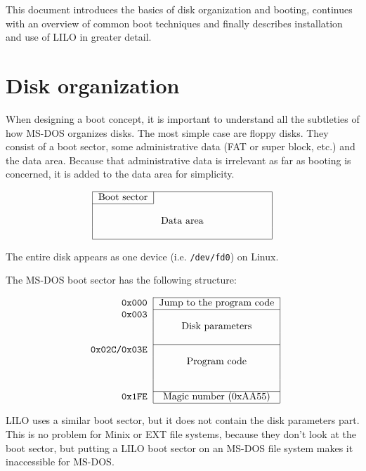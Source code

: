 This document introduces the basics of disk organization and booting,
continues with an overview of common boot techniques and finally describes
installation and use of LILO in greater detail.


\section{Disk organization}

When designing a boot concept, it is important to understand all the
subtleties of how MS-DOS organizes disks. The most simple case are
floppy disks. They consist of a boot sector, some administrative
data (FAT or super block, etc.) and the data area. Because that
administrative data is irrelevant as far as booting is concerned, it is
added to the data area for simplicity.

$$
\begin{tabular}{|c|c|}
  \hline
  Boot sector & \hbox to 1.5in{\hfil} \\
  \cline{1-1}
  \multicolumn{2}{|c|}{} \\
  \multicolumn{2}{|c|}{Data area} \\
  \multicolumn{2}{|c|}{} \\
  \hline
  \end{tabular}
$$

The entire disk appears as one device (i.e. {\tt /dev/fd0}) on Linux.

The MS-DOS boot sector has the following structure:

$$
\begin{tabular}{r|c|}
  \cline{2-2}
  \tt 0x000 & Jump to the program code\\
  \cline{2-2}
  \tt 0x003 & \\
  & Disk parameters \\
  & \\
  \cline{2-2}
  \tt 0x02C/0x03E & \\
  & Program code \\
  & \\
  & \\
  \cline{2-2}
  \tt 0x1FE & Magic number (0xAA55)\\
  \cline{2-2}
\end{tabular}
$$

LILO uses a similar boot sector, but it does not contain the disk
parameters part. This is no problem for Minix or EXT file systems, because
they don't look at the boot sector, but putting a LILO boot sector on an
MS-DOS file system makes it inaccessible for MS-DOS.

